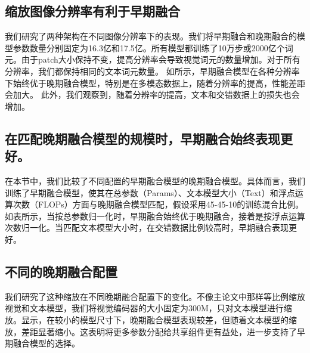 

\subsection{缩放图像分辨率有利于早期融合}

我们研究了两种架构在不同图像分辨率下的表现。我们将早期融合和晚期融合的模型参数数量分别固定为16.3亿和17.5亿。所有模型都训练了10万步或2000亿个词元。由于patch大小保持不变，提高分辨率会导致视觉词元的数量增加。对于所有分辨率，我们都保持相同的文本词元数量。
如所示，早期融合模型在各种分辨率下始终优于晚期融合模型，特别是在多模态数据上，随着分辨率的提高，性能差距会加大。
此外，我们观察到，随着分辨率的提高，文本和交错数据上的损失也会增加。

\vspace{1cm}
\subsection{在匹配晚期融合模型的规模时，早期融合始终表现更好。}



在本节中，我们比较了不同配置的早期融合模型的晚期融合模型。具体而言，我们训练了早期融合模型，使其在总参数（Params）、文本模型大小（Text）和浮点运算次数（FLOPs）方面与晚期融合模型匹配，假设采用45-45-10的训练混合比例。如表所示，当按总参数归一化时，早期融合始终优于晚期融合，接着是按浮点运算次数归一化。当匹配文本模型大小时，在交错数据比例较高时，早期融合表现更好。 







\subsection{不同的晚期融合配置} 
我们研究了这种缩放在不同晚期融合配置下的变化。不像主论文中那样等比例缩放视觉和文本模型，我们将视觉编码器的大小固定为300M，只对文本模型进行缩放。显示，在较小的模型尺寸下，晚期融合模型表现较差，但随着文本模型的缩放，差距显著缩小。这表明将更多参数分配给共享组件更有益处，进一步支持了早期融合模型的选择。










